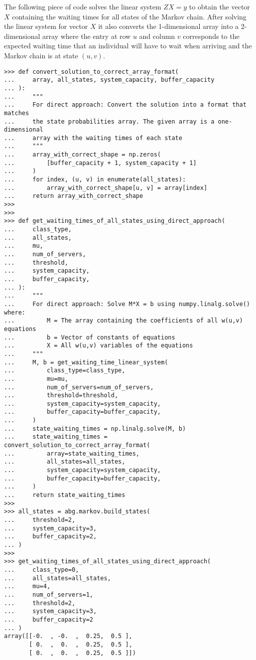 The following piece of code solves the linear system \(Z X = y\) to obtain the
vector \(X\) containing the waiting times for all states of the Markov chain.
After solving the linear system for vector \(X\) it also converts the
1-dimensional array into a 2-dimensional array where the entry at row \(u\) and
column \(v\) corresponds to the expected waiting time that an individual will
have to wait when arriving and the Markov chain is at state \((u,v)\).

\begin{lstlisting}[style=pystyle]
>>> def convert_solution_to_correct_array_format(
...     array, all_states, system_capacity, buffer_capacity
... ):
...     """
...     For direct approach: Convert the solution into a format that matches
...     the state probabilities array. The given array is a one-dimensional
...     array with the waiting times of each state
...     """
...     array_with_correct_shape = np.zeros(
...         [buffer_capacity + 1, system_capacity + 1]
...     )
...     for index, (u, v) in enumerate(all_states):
...         array_with_correct_shape[u, v] = array[index]
...     return array_with_correct_shape
>>>
>>>
>>> def get_waiting_times_of_all_states_using_direct_approach(
...     class_type,
...     all_states,
...     mu,
...     num_of_servers,
...     threshold,
...     system_capacity,
...     buffer_capacity,
... ):
...     """
...     For direct approach: Solve M*X = b using numpy.linalg.solve() where:
...         M = The array containing the coefficients of all w(u,v) equations
...         b = Vector of constants of equations
...         X = All w(u,v) variables of the equations
...     """
...     M, b = get_waiting_time_linear_system(
...         class_type=class_type,
...         mu=mu,
...         num_of_servers=num_of_servers,
...         threshold=threshold,
...         system_capacity=system_capacity,
...         buffer_capacity=buffer_capacity,
...     )
...     state_waiting_times = np.linalg.solve(M, b)
...     state_waiting_times = convert_solution_to_correct_array_format(
...         array=state_waiting_times,
...         all_states=all_states,
...         system_capacity=system_capacity,
...         buffer_capacity=buffer_capacity,
...     )
...     return state_waiting_times
>>>
>>> all_states = abg.markov.build_states(
...     threshold=2,
...     system_capacity=3,
...     buffer_capacity=2,
... )
>>>
>>> get_waiting_times_of_all_states_using_direct_approach(
...     class_type=0,
...     all_states=all_states,
...     mu=4,
...     num_of_servers=1,
...     threshold=2,
...     system_capacity=3,
...     buffer_capacity=2
... )
array([[-0.  , -0.  ,  0.25,  0.5 ],
       [ 0.  ,  0.  ,  0.25,  0.5 ],
       [ 0.  ,  0.  ,  0.25,  0.5 ]])

\end{lstlisting}


